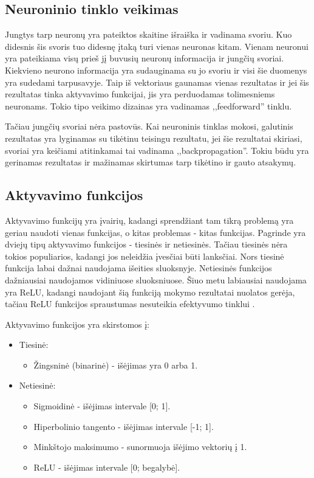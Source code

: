 \documentclass{VUMIFPSkursinis}
\begin{document}
\subsection{Neuroninio tinklo veikimas}
Jungtys tarp neuronų yra pateiktos skaitine išraiška ir vadinama svoriu. Kuo didesnis šis svoris tuo didesnę įtaką turi vienas neuronas kitam.
Vienam neuronui yra pateikiama visų prieš jį buvusių neuronų informacija ir jungčių svoriai. Kiekvieno neurono informacija yra sudauginama su
jo svoriu ir visi šie duomenys yra sudedami tarpusavyje. Taip iš vektoriaus gaunamas vienas rezultatas ir jei šis rezultatas tinka aktyvavimo
funkcijai, jis yra perduodamas tolimesniems neuronams. Tokio tipo veikimo dizainas yra vadinamas ,,feedforward'' tinklu.

Tačiau jungčių svoriai nėra pastovūs. Kai neuroninis tinklas mokosi, galutinis rezultatas yra lyginamas su tikėtinu teisingu rezultatu, jei šie
rezultatai skiriasi, svoriai yra keičiami atitinkamai tai vadinama ,,backpropagation''. Tokiu būdu yra gerinamas rezultatas ir mažinamas skirtumas
tarp tikėtino ir gauto atsakymų.

\subsection{Aktyvavimo funkcijos}
Aktyvavimo funkcijų yra įvairių, kadangi sprendžiant tam tikrą problemą yra geriau naudoti vienas funkcijas, o kitas problemas - kitas funkcijas.
Pagrinde yra dviejų tipų aktyvavimo funkcijos - tiesinės ir netiesinės. Tačiau tiesinės nėra tokios populiarios, kadangi jos neleidžia įvesčiai
būti lanksčiai. Nors tiesinė funkcija labai dažnai naudojama išeities sluoksnyje.
Netiesinės funkcijos dažniausiai naudojamos vidiniuose sluoksniuose. Šiuo metu labiausiai naudojama yra ReLU, kadangi naudojant šią funkciją mokymo
rezultatai nuolatos gerėja, tačiau ReLU funkcijos spraustumas nesuteikia efektyvumo tinklui \cite{DBLP:journals/corr/XuWCL15}.

Aktyvavimo funkcijos yra skirstomos į:
\begin{itemize}
\item Tiesinė: 
\begin{itemize}
\item Žingsninė (binarinė) - išėjimas yra 0 arba 1.
\end{itemize}
\item Netiesinė: 
\begin{itemize}
\item Sigmoidinė - išėjimas intervale [0; 1].
\item Hiperbolinio tangento - išėjimas intervale [-1; 1].
\item Minkštojo maksimumo - sunormuoja išėjimo vektorių į 1.
\item ReLU - išėjimas intervale [0; begalybė].
\end{itemize}
\end{itemize}
\end{document}
